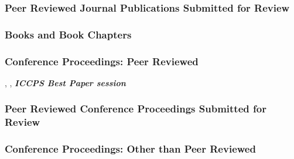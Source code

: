 
\subsubsection{Peer Reviewed Journal Publications Submitted for Review}

\subsubsection{Books and Book Chapters}

\subsubsection{Conference Proceedings: Peer Reviewed}

\begin{conferencebib}
\item {}, , \textbf{\emph{ICCPS Best Paper session}}
\end{conferencebib}


\subsubsection*{Peer Reviewed Conference Proceedings Submitted for Review}


\subsubsection{Conference Proceedings: Other than Peer Reviewed}


